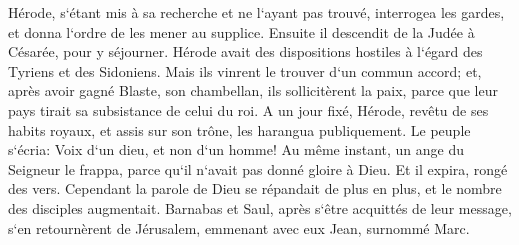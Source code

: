 \verse Hérode, s`étant mis à sa recherche et ne l`ayant pas trouvé, interrogea les gardes, et donna l`ordre de les mener au supplice. Ensuite il descendit de la Judée à Césarée, pour y séjourner. 
\verse Hérode avait des dispositions hostiles à l`égard des Tyriens et des Sidoniens. Mais ils vinrent le trouver d`un commun accord; et, après avoir gagné Blaste, son chambellan, ils sollicitèrent la paix, parce que leur pays tirait sa subsistance de celui du roi. 
\verse A un jour fixé, Hérode, revêtu de ses habits royaux, et assis sur son trône, les harangua publiquement. 
\verse Le peuple s`écria: Voix d`un dieu, et non d`un homme! 
\verse Au même instant, un ange du Seigneur le frappa, parce qu`il n`avait pas donné gloire à Dieu. Et il expira, rongé des vers. 
\verse Cependant la parole de Dieu se répandait de plus en plus, et le nombre des disciples augmentait. 
\verse Barnabas et Saul, après s`être acquittés de leur message, s`en retournèrent de Jérusalem, emmenant avec eux Jean, surnommé Marc. 

\chapter{}

